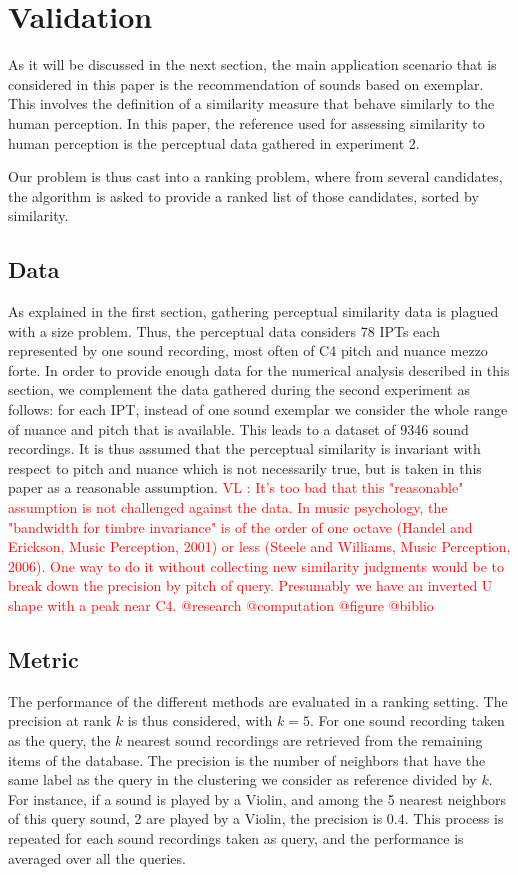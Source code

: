 \documentclass{article}
\newcommand{\ipt}{IPT\xspace}
\newcommand{\ipts}{IPTs\xspace}
\newcommand{\vl}[1]{\textcolor{red}{VL : #1}}
\begin{document}
\section{Validation}\label{sec:validation}

As it will be discussed in the next section, the main application scenario that is considered in this paper is the recommendation of sounds based on exemplar. This involves the definition of a similarity measure that behave similarly to the human perception. In this paper, the reference used for assessing similarity to human perception is the perceptual data gathered in experiment 2.

Our problem is thus cast into a ranking problem, where from several candidates, the algorithm is asked to provide a ranked list of those candidates, sorted by similarity.

\subsection{Data}

As explained in the first section, gathering perceptual similarity data is plagued with a size problem. Thus, the perceptual data considers 78 \ipts each represented by one sound recording, most often of C4 pitch and nuance mezzo forte. In order to provide enough data for the numerical analysis described in this section, we complement the data gathered during the second experiment as follows: for each \ipt, instead of one sound exemplar we consider the whole range of nuance and pitch that is available. This leads to a dataset of 9346 sound recordings. It is thus assumed that the perceptual similarity is invariant with respect to pitch and nuance which is not necessarily true, but is taken in this paper as a reasonable assumption.
\vl{It's too bad that this "reasonable" assumption is not challenged against the data. In music psychology, the "bandwidth for timbre invariance" is of the order of one octave (Handel and Erickson, Music Perception, 2001) or less (Steele and Williams, Music Perception, 2006).
One way to do it without collecting new similarity judgments would be to break down the precision by pitch of query.
Presumably we have an inverted U shape with a peak near C4.
@research @computation @figure @biblio}

\subsection{Metric}

The performance of the different methods are evaluated in a ranking setting. The precision at rank $k$ is thus considered, with $k=5$. For one sound recording taken as the query, the $k$ nearest sound recordings are retrieved from the remaining items of the database. The precision is the number of neighbors that have the same label as the query in the clustering we consider as reference divided by $k$. For instance, if a sound is played by a Violin, and among the 5 nearest neighbors of this query sound, 2 are played by a Violin, the precision is $0.4$. This process is repeated for each sound recordings taken as query, and the performance is averaged over all the queries.
\end{document}
